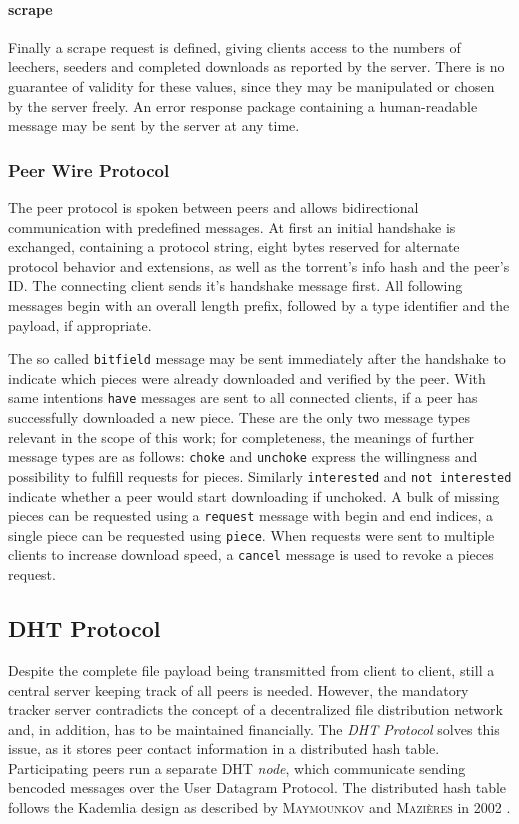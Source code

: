 \documentclass[10pt, a4paper]{scrartcl} %
\renewcommand{\_}{\origunderscore\allowbreak}
\begin{document}
\paragraph{scrape}
Finally a scrape request is defined, giving clients access to the numbers of leechers, seeders and completed downloads as reported by the server. There is no guarantee of validity for these values, since they may be manipulated or chosen by the server freely. An error response package containing a human-readable message may be sent by the server at any time.

\subsubsection{Peer Wire Protocol}
The peer protocol is spoken between peers and allows bidirectional communication with predefined messages. At first an initial handshake is exchanged, containing a protocol string, eight bytes reserved for alternate protocol behavior and extensions, as well as the torrent's info hash and the peer's ID. The connecting client sends it's handshake message first. All following messages begin with an overall length prefix, followed by a type identifier and the payload, if appropriate.

The so called \texttt{bitfield} message may be sent immediately after the handshake to indicate which pieces were already downloaded and verified by the peer. With same intentions \texttt{have} messages are sent to all connected clients, if a peer has successfully downloaded a new piece. These are the only two message types relevant in the scope of this work; for completeness, the meanings of further message types are as follows: \texttt{choke} and \texttt{unchoke} express the willingness and possibility to fulfill requests for pieces. Similarly \texttt{interested} and \texttt{not interested} indicate whether a peer would start downloading if unchoked. A bulk of missing pieces can be requested using a \texttt{request} message with begin and end indices, a single piece can be requested using \texttt{piece}. When requests were sent to multiple clients to increase download speed, a \texttt{cancel} message is used to revoke a pieces request.

\subsection{DHT Protocol}
Despite the complete file payload being transmitted from client to client, still a central server keeping track of all peers is needed. However, the mandatory tracker server contradicts the concept of a decentralized file distribution network and, in addition, has to be maintained financially. The \emph{DHT Protocol} \cite{bep5} solves this issue, as it stores peer contact information in a distributed hash table. Participating peers run a separate DHT \emph{node}, which communicate sending bencoded messages over the User Datagram Protocol. The distributed hash table follows the Kademlia design as described by \textsc{Maymounkov} and \textsc{Mazières} in 2002 \cite{kademlia}.
\end{document}

